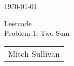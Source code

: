 
\begin{titlepage}
    \noindent \large \today

    \vspace*{2.25in}

    \begin{center}
        \Huge Leetcode \\
        \Huge Problem 1: Two Sum
    \end{center}

    \vspace*{4.5in}

    \hfill
    \begin{tabular}{l}
        \large Mitch Sullivan
    \end{tabular}
\end{titlepage}
